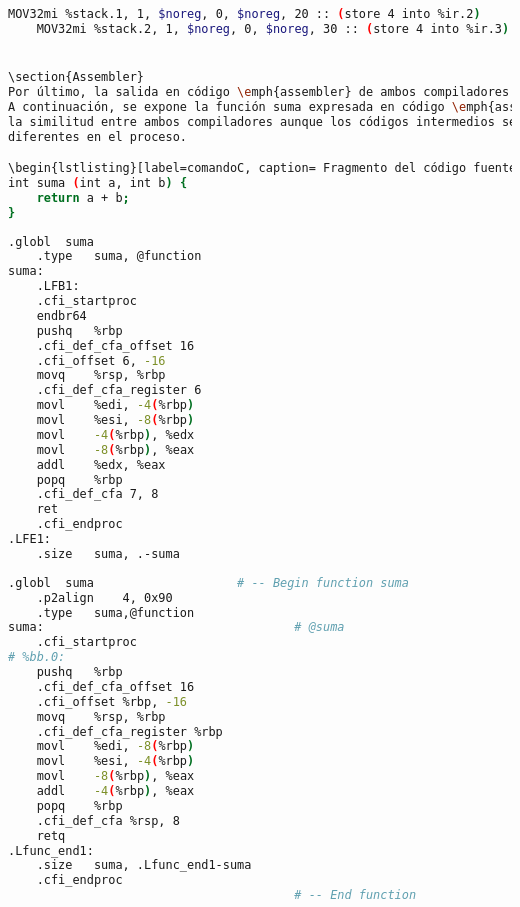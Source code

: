 \begin{lstlisting}[label=comandoC, caption= Fragmento de MachineInstr de CLANG/LLVM del archivo machineinstrs. \cite{repositorio}, language=bash]
    MOV32mi %stack.1, 1, $noreg, 0, $noreg, 20 :: (store 4 into %ir.2)
    MOV32mi %stack.2, 1, $noreg, 0, $noreg, 30 :: (store 4 into %ir.3) \end{lstlisting}


\section{Assembler}
Por último, la salida en código \emph{assembler} de ambos compiladores es prácticamente la misma. 
A continuación, se expone la función suma expresada en código \emph{assembler} destacando 
la similitud entre ambos compiladores aunque los códigos intermedios sean notoriamente 
diferentes en el proceso.

\begin{lstlisting}[label=comandoC, caption= Fragmento del código fuente del archivo codigo-ejemplo.c. \cite{repositorio}, language=bash]
int suma (int a, int b) {
    return a + b;
}   \end{lstlisting}

\begin{lstlisting}[label=comandoC, caption= Fragmento del código \emph{assembler} de GCC del archivo codigo-ejemplo.s. \cite{repositorio}, language=bash]
    .globl	suma
    .type	suma, @function
suma:
    .LFB1:
    .cfi_startproc
    endbr64
    pushq	%rbp
    .cfi_def_cfa_offset 16
    .cfi_offset 6, -16
    movq	%rsp, %rbp
    .cfi_def_cfa_register 6
    movl	%edi, -4(%rbp)
    movl	%esi, -8(%rbp)
    movl	-4(%rbp), %edx
    movl	-8(%rbp), %eax
    addl	%edx, %eax
    popq	%rbp
    .cfi_def_cfa 7, 8
    ret
    .cfi_endproc
.LFE1:
    .size	suma, .-suma    \end{lstlisting}

\begin{lstlisting}[label=comandoC, caption= Fragmento del código \emph{assembler} de CLANG/LLVM del archivo assembly.s. \cite{repositorio}, language=bash]
	.globl	suma                    # -- Begin function suma
	.p2align	4, 0x90
	.type	suma,@function
suma:                                   # @suma
	.cfi_startproc
# %bb.0:
	pushq	%rbp
	.cfi_def_cfa_offset 16
	.cfi_offset %rbp, -16
	movq	%rsp, %rbp
	.cfi_def_cfa_register %rbp
	movl	%edi, -8(%rbp)
	movl	%esi, -4(%rbp)
	movl	-8(%rbp), %eax
	addl	-4(%rbp), %eax
	popq	%rbp
	.cfi_def_cfa %rsp, 8
	retq
.Lfunc_end1:
	.size	suma, .Lfunc_end1-suma
	.cfi_endproc
                                        # -- End function   \end{lstlisting}